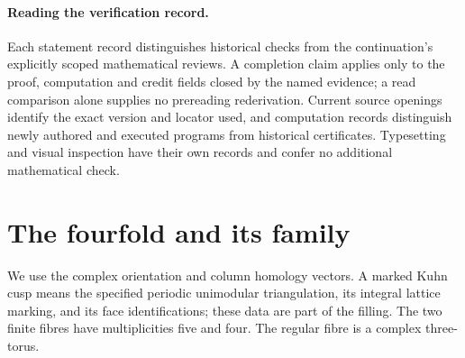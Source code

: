 \documentclass[11pt,a4paper]{article}
\theoremstyle{definition}
\begin{document}
\paragraph{Reading the verification record.}
Each statement record distinguishes historical checks from the
continuation's explicitly scoped mathematical reviews. A completion
claim applies only to the proof, computation and credit fields closed
by the named evidence; a read comparison alone supplies no prereading
rederivation. Current source openings identify the exact version and
locator used, and computation records distinguish newly authored and
executed programs from historical certificates. Typesetting and visual inspection have their
own records and confer no additional mathematical check.

\section{The fourfold and its family}
\label{sec:V-results}

We use the complex orientation and column homology vectors.  A marked
Kuhn cusp means the specified periodic unimodular triangulation, its
integral lattice marking, and its face identifications; these data are
part of the filling.  The two finite fibres have multiplicities five
and four.  The regular fibre is a complex three-torus.
\end{document}
